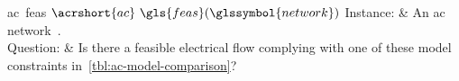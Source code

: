\begin{problem}[framed]{\acrlong{ac}~\acrlong{feas} $\acrshort{ac}~\gls{feas}
(\glssymbol{network})$}%
  Instance: & An \gls{ac} network~\acnetworktuple.\\
  Question: & Is there a feasible electrical flow complying with one of these
  model constraints in~\cref{tbl:ac-model-comparison}?
\end{problem}%